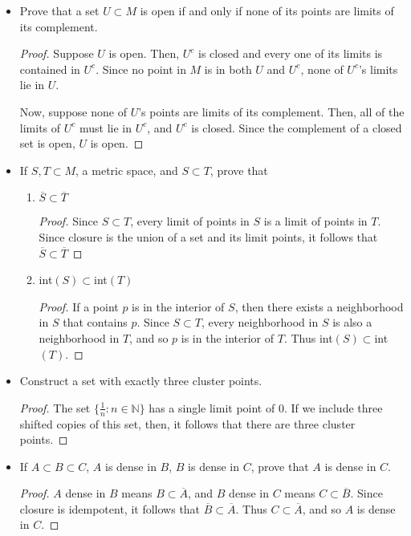 \documentclass[11pt,a4paper]{article}
\newcommand{\pnum}[1]{\item[\textbf{#1}]}
\newcommand{\N}{\mathbb{N}}
\newcommand{\cl}[1]{\overline{#1}}
\begin{document}
\begin{itemize}
	\pnum{2.5} Prove that a set $U \subset M$ is open if and only if none of its points are limits of
	its complement.
	\begin{proof}
	Suppose $U$ is open. Then, $U^c$ is closed and every one of its limits is contained in $U^c$.
	Since no point in $M$ is in both $U$ and $U^c$, none of $U^c$'s limits lie in $U$.

	Now, suppose none of $U$'s points are limits of its complement. Then, all of the limits of
	$U^c$ must lie in $U^c$, and $U^c$ is closed. Since the complement of a closed set is open,
	$U$ is open.
	\end{proof}

	\pnum{2.6} If $S,T \subset M$, a metric space, and $S \subset T$, prove that
	\begin{enumerate}[label=\alph*)]
		\item $\overline{S} \subset \overline{T}$
	\begin{proof}
		Since $S \subset T$, every limit of points in $S$ is a limit of points in $T$. Since closure
		is the union of a set and its limit points, it follows that $\overline{S} \subset \overline{T}$
	\end{proof}
		\item int$(S)\subset$int$(T)$
	\begin{proof}
		If a point $p$ is in the interior of $S$, then there exists a neighborhood in $S$ that contains
		$p$. Since $S \subset T$, every neighborhood in $S$ is also a neighborhood in $T$, and so $p$
		is in the interior of $T$. Thus int$(S)\subset$int$(T)$.
	\end{proof}
	\end{enumerate}

	\pnum{2.7} Construct a set with exactly three cluster points.
	\begin{proof}
		The set $\{\frac{1}{n} : n \in \N\}$ has a single limit point of 0. If we include three shifted
		copies of this set, then, it follows that there are three cluster points.
	\end{proof}

	\pnum{2.8} If $A \subset B \subset C$, $A$ is dense in $B$, $B$ is dense in $C$, prove that
	$A$ is dense in $C$.
	\begin{proof}
		$A$ dense in $B$ means $B \subset \cl{A}$, and $B$ dense in $C$ means $C \subset \cl{B}$.
		Since closure is idempotent, it follows that $\cl{B} \subset \cl{A}$. Thus $C \subset \cl{A}$,
		and so $A$ is dense in $C$.
	\end{proof}


\end{itemize}
\end{document}
